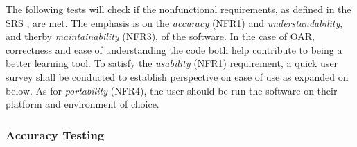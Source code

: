 \documentclass[12pt, titlepage]{article}
\begin{document}
The following tests will check if the nonfunctional requirements, as defined in the SRS \citep{SRS}, are 
met. The emphasis is on the \textit{accuracy} (NFR1) and \textit{understandability}, and 
therby \textit{maintainability} (NFR3), of the software. In the case of OAR, 
correctness and ease of understanding the code both help contribute to being a better learning tool.
To satisfy the \textit{usability} (NFR1) requirement, a quick user survey shall be
conducted to establish perspective on ease of use as expanded on below. As for \textit{portability} (NFR4),
the user should be run the software on their platform and environment of choice.


\subsubsection{Accuracy Testing}
\end{document}
